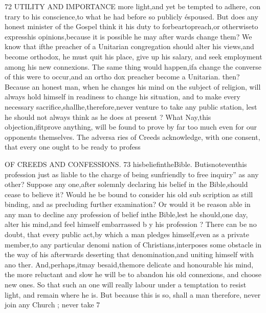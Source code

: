 \documentclass[
]{book}
\begin{document}
72
UTILITY AND IMPORTANCE
more light,and yet be tempted to adhere, con trary to his conscience,to what he had before
so publicly éspoused. But does any honest minister of the Gospel think it his duty to forbeartopreach,or otherwiseto expresshis
opinions,because it is possible he may after wards change them? We know that ifthe
preacher of a Unitarian congregation should alter his views,and become orthodox, he must quit his place, give up his salary, and seek employment among his new connexions.
The same thing would happen,ifa change the converse of this were to occur,and an ortho
dox preacher become a Unitarian.
then? Because an honest man, when he changes his mind on the subject of religion,
will always hold himself in readiness to change his situation, and to make every necessary
sacrifice,shallhe,therefore,never venture to take any public station, lest he should not always think as he does at present ?
What
Nay,this objection,ifitprove anything,
will be found to prove by far too much even for our opponents themselves. The adversa ries of Creeds acknowledge, with one consent,
that every one ought to be ready to profess

OF CREEDS AND CONFESSIONS. 73
hisbeliefintheBible. Butisnoteventhis
profession just as liable to the charge of being sunfriendly to free inquiry'' as any other? Suppose any one,after solemnly declaring his belief in the Bible,should cease to believe it? Would he be bound to consider his old sub
scription as still binding, and as precluding further examination? Or would it be reason
able in any man to decline any profession of belief inthe Bible,lest he should,one day,
alter his mind,and feel himself embarrassed b y his profession ?
There can be no doubt, that every public
act,by which a man pledges himself,even as a private member,to any particular denomi
nation of Christians,interposes some obstacle in the way of his afterwards deserting that
denomination,and uniting himself with ano ther. And,perhaps,itmay besaid,themore delicate and honourable his mind, the more reluctant and slow he will be to abandon his old connexions, and choose new ones. So
that such an one will really labour under a temptation to resist light, and remain where he is. But because this is so, shall a man
therefore, never join any Church ; never take
7
\end{document}
